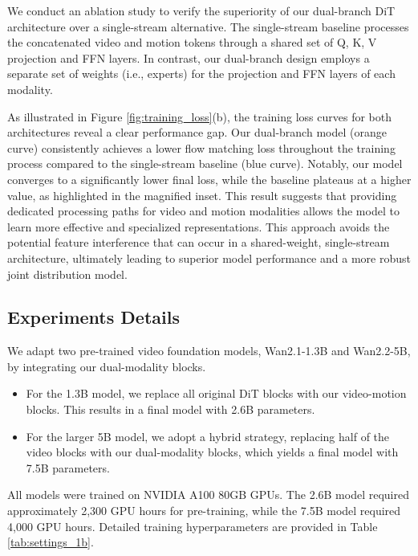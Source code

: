 {We conduct an ablation study to verify the superiority of our dual-branch DiT architecture over a single-stream alternative. The single-stream baseline processes the concatenated video and motion tokens through a shared set of Q, K, V projection and FFN layers. In contrast, our dual-branch design employs a separate set of weights (i.e., experts) for the projection and FFN layers of each modality.

As illustrated in Figure \ref{fig:training_loss}(b), the training loss curves for both architectures reveal a clear performance gap. Our dual-branch model (orange curve) consistently achieves a lower flow matching loss throughout the training process compared to the single-stream baseline (blue curve). Notably, our model converges to a significantly lower final loss, while the baseline plateaus at a higher value, as highlighted in the magnified inset. This result suggests that providing dedicated processing paths for video and motion modalities allows the model to learn more effective and specialized representations. This approach avoids the potential feature interference that can occur in a shared-weight, single-stream architecture, ultimately leading to superior model performance and a more robust joint distribution model.
}

\subsection{Experiments Details}
We adapt two pre-trained video foundation models, Wan2.1-1.3B and Wan2.2-5B, by integrating our dual-modality blocks.
\begin{itemize}
    \item For the 1.3B model, we replace all original DiT blocks with our video-motion blocks. This results in a final model with 2.6B parameters.
    \item For the larger 5B model, we adopt a hybrid strategy, replacing half of the video blocks with our dual-modality blocks, which yields a final model with 7.5B parameters.
\end{itemize}

All models were trained on NVIDIA A100 80GB GPUs. The 2.6B model required approximately 2,300 GPU hours for pre-training, while the 7.5B model required 4,000 GPU hours. Detailed training hyperparameters are provided in Table \ref{tab:settings_1b}.






